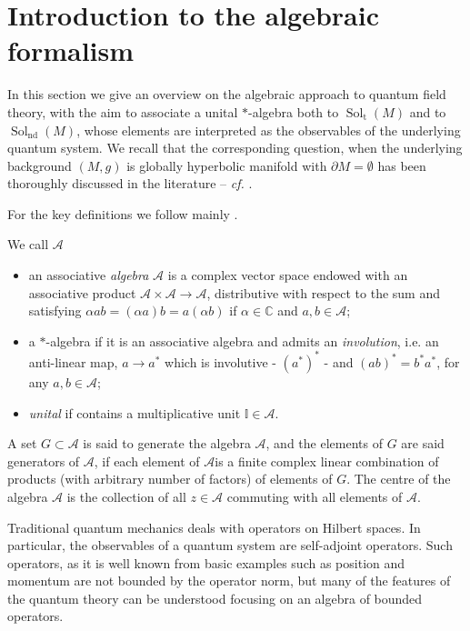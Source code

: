 \section{Introduction to the algebraic formalism}
\label{Sec: intro to algebraic}

In this section we give an overview on the algebraic approach to quantum field theory, with the aim to associate a unital $*$-algebra both to $\operatorname{Sol}_{\mathrm{t}}(M)$ and to $\operatorname{Sol}_{\mathrm{nd}}(M)$, whose elements are interpreted as the observables of the underlying quantum system. We recall that the corresponding question, when the underlying background $(M,g)$ is globally hyperbolic manifold with $\partial M=\emptyset$ has been thoroughly discussed in the literature -- \textit{cf.} \cite{Benini-16,Dappiaggi:2011cj,Hack-Schenkel-13,Dappiaggi-Hack-Sanders-14}.


For the key definitions we follow mainly \cite{khavkine2015algebraic}.

\begin{Definition}
	We call $\mathcal{A}$
	\begin{itemize}
		\item an associative \emph{algebra} $\mathcal{A}$ is a complex vector space endowed with an associative product $\mathcal{A}\times\mathcal{A}\to\mathcal{A}$, distributive with respect to the sum and satisfying $\alpha ab=(\alpha a)b=a(\alpha b)$ if $\alpha\in\mathbb{C}$ and $a,b\in\mathcal{A}$;
		\item a $*$-algebra if it is an associative algebra and admits an \emph{involution}, i.e. an anti-linear map, $a\to a^*$ which is involutive - $(a^*)^*$ - and $(ab)^*=b^*a^*$, for any $a,b\in\mathcal{A}$;
		\item \emph{unital} if contains a multiplicative unit $\mathbb{I}\in\mathcal{A}$.
	\end{itemize}
	A set $G\subset\mathcal{A}$ is said to generate the algebra $\mathcal{A}$, and the elements of $G$ are said
	generators of $\mathcal{A}$, if each element of $\mathcal{A}$is a finite complex linear combination of products (with arbitrary number of factors) of elements of $G$.
	The centre of the algebra $\mathcal{A}$ is the collection of all $z \in\mathcal{A}$ commuting with
	all elements of $\mathcal{A}$.
\end{Definition}

Traditional quantum mechanics deals with operators on Hilbert spaces. In particular, the observables of a quantum system are self-adjoint operators. Such operators, as it is well known from basic examples such as position and momentum are not bounded by the operator norm, but many of the features of the quantum theory can be understood focusing on an algebra of bounded operators.


